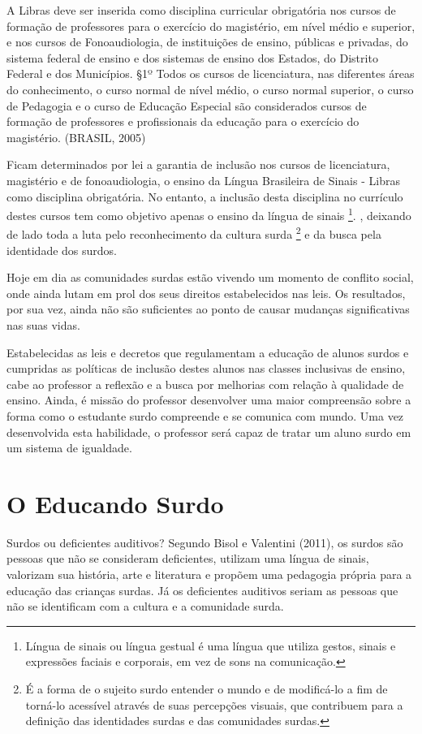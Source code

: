 \documentclass[brasil]{abnt}
\begin{document}
			\begin{citacao} A Libras deve ser inserida como disciplina curricular obrigatória nos cursos de formação de professores para o exercício do magistério, em nível médio e superior, e nos cursos de 
							Fonoaudiologia, de instituições de ensino, públicas e privadas, do sistema federal de ensino e dos sistemas de ensino dos Estados, do Distrito Federal e dos Municípios.
							\S 1º Todos os cursos de licenciatura, nas diferentes áreas do conhecimento, o curso normal de nível médio, o curso normal superior, o curso de Pedagogia e o curso de Educação 
							Especial são considerados cursos de formação de professores e 
							profissionais da educação para o exercício do magistério. 
							(BRASIL, 2005)
			\end{citacao}
	
	Ficam determinados por lei a garantia de inclusão nos cursos de licenciatura, magistério e de fonoaudiologia, o ensino da Língua Brasileira de Sinais - Libras como disciplina obrigatória. No entanto, 
	a inclusão desta disciplina no currículo destes cursos tem como objetivo apenas o ensino da língua de sinais
	\footnote{Língua de sinais ou língua gestual é uma língua que utiliza gestos, sinais e expressões faciais e corporais, em vez de sons na comunicação.}.
	, deixando de lado toda a luta pelo reconhecimento da cultura surda \footnote{É a forma de o sujeito 
	surdo entender o mundo e de modificá-lo a fim de torná-lo acessível através de suas percepções visuais, que contribuem para a definição das identidades surdas e das comunidades surdas.} e da busca 
	pela identidade dos surdos.  
	
	Hoje em dia as comunidades surdas estão vivendo um momento de conflito social, onde ainda lutam em prol dos seus direitos estabelecidos nas leis. Os resultados, por sua vez, ainda não são suficientes ao 
	ponto de causar mudanças significativas nas suas vidas. 
		
	Estabelecidas as leis e decretos que regulamentam a educação de alunos surdos e cumpridas as políticas de inclusão destes alunos nas classes inclusivas de ensino, cabe ao professor a reflexão e a busca por 
	melhorias com relação à qualidade de ensino. Ainda, é missão do professor desenvolver uma maior compreensão sobre a forma como o estudante surdo compreende e se comunica com mundo. 
	Uma vez desenvolvida esta habilidade, o professor será capaz de tratar um aluno surdo em um sistema de igualdade. 		     
	

\chapter{O Educando Surdo}
		Surdos ou deficientes auditivos? Segundo Bisol e Valentini (2011), os surdos são pessoas que não se consideram deficientes, utilizam uma língua de sinais, valorizam sua história, arte e literatura 
		e propõem uma pedagogia própria para a educação das crianças surdas. Já os deficientes auditivos seriam as pessoas que não se identificam com a cultura e a comunidade surda. 
				
\end{document}
